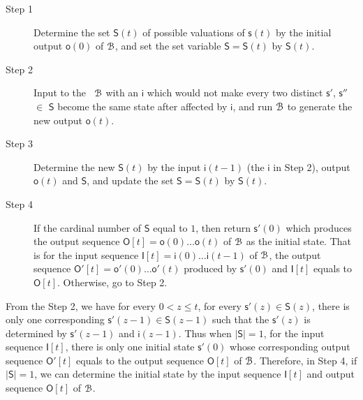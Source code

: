 
\begin{description}
	\item[Step 1]  Determine the set $\mathsf{S}(t)$ of possible valuations of $\mathsf{s}(t)$ by the initial output $\mathsf{o}(0)$ of ${\mathcal{B}}$, and set the set variable $\mathsf{S}=\mathsf{S}(t)$ by $\mathsf{S}(t)$.
	\item[Step 2] Input to the \BCN\ ${\mathcal{B}}$ with an $\mathsf{i}$ which would not make every two distinct $\mathsf{s}'$, $\mathsf{s}''$$\in$ $\mathsf{S}$ become the same state after affected by $\mathsf{i}$, and run ${\mathcal{B}}$ to generate the new output $\mathsf{o}(t)$. 
	\item[Step 3] Determine the new $\mathsf{S}(t)$ by the input $\mathsf{i}(t-1)$ (the $\mathsf{i}$ in Step 2), output $\mathsf{o}(t)$ and $\mathsf{S}$, and update the set $\mathsf{S}=\mathsf{S}(t)$ by $\mathsf{S}(t)$.
	\item[Step 4] If the cardinal number of $\mathsf{S}$ equal to $1$, then return $\mathsf{s}'(0)$ which produces the output sequence $\mathsf{O}[t]=\mathsf{o}(0)\ldots\mathsf{o}(t)$ of ${\mathcal{B}}$ as the initial state. That is for the input sequence $\mathsf{I}[t]=\mathsf{i}(0)\ldots\mathsf{i}(t-1)$ of ${\mathcal{B}}$,  the output sequence $\mathsf{O}'[t]=\mathsf{o}'(0)\ldots\mathsf{o}'(t)$ produced by $\mathsf{s}'(0)$ and $\mathsf{I}[t]$ equals to $\mathsf{O}[t]$. Otherwise, go to Step 2.
\end{description}



From the Step 2, we have for every $0< z\le t$, for every $\mathsf{s}'(z)\in \mathsf{S}(z)$, there is only one corresponding $\mathsf{s}'(z-1)\in \mathsf{S}(z-1)$ such that the $\mathsf{s}'(z)$ is determined by $\mathsf{s}'(z-1)$ and $\mathsf{i}(z-1)$. Thus %
 when $|\mathsf{S}|=1$, for the input sequence $\mathsf{I}[t]$, there is only one initial state $\mathsf{s}'(0)$ whose corresponding output sequence  $\mathsf{O}'[t]$ equals to the output sequence $\mathsf{O}[t]$ of ${\mathcal{B}}$. Therefore, in Step 4, if $|\mathsf{S}|=1$, we can determine the initial state by the input sequence $\mathsf{I}[t]$ and output sequence $\mathsf{O}[t]$ of ${\mathcal{B}}$.

